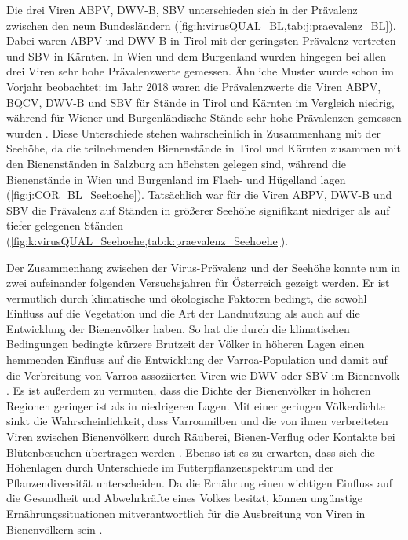 Die drei Viren ABPV, DWV-B, SBV unterschieden sich in der Prävalenz zwischen den neun Bundesländern (\cref{fig:h:virusQUAL_BL,tab:j:praevalenz_BL}). Dabei waren ABPV und DWV-B in Tirol mit der geringsten Prävalenz vertreten und SBV in Kärnten. In Wien und dem Burgenland wurden hingegen bei allen drei Viren sehr hohe Prävalenzwerte gemessen. Ähnliche Muster wurde schon im Vorjahr beobachtet: im Jahr 2018 waren die Prävalenzwerte die Viren ABPV, BQCV, DWV-B und SBV für Stände in Tirol und Kärnten im Vergleich niedrig, während für Wiener und Burgenländische Stände sehr hohe Prävalenzen gemessen wurden \citep{brodschneider2019b}. Diese Unterschiede stehen wahrscheinlich in Zusammenhang mit der Seehöhe, da die teilnehmenden Bienenstände in Tirol und Kärnten zusammen mit den Bienenständen in Salzburg am höchsten gelegen sind, während die Bienenstände in Wien und Burgenland im Flach- und Hügelland lagen (\cref{fig:j:COR_BL_Seehoehe}). Tatsächlich war für die Viren ABPV, DWV-B und SBV die Prävalenz auf Ständen in größerer Seehöhe signifikant niedriger als auf tiefer gelegenen Ständen (\cref{fig:k:virusQUAL_Seehoehe,tab:k:praevalenz_Seehoehe}).


Der Zusammenhang zwischen der Virus-Prävalenz und der Seehöhe konnte nun in zwei aufeinander folgenden Versuchsjahren für Österreich gezeigt werden. Er ist vermutlich durch klimatische und ökologische Faktoren bedingt, die sowohl Einfluss auf die Vegetation und die Art der Landnutzung als auch auf die Entwicklung der Bienenvölker haben. So hat die durch die klimatischen Bedingungen bedingte kürzere Brutzeit der Völker in höheren Lagen einen hemmenden Einfluss auf die Entwicklung der Varroa-Population und damit auf die Verbreitung von Varroa-assoziierten Viren wie DWV oder SBV im Bienenvolk \citep{mcmenamin2015,sumpter2004}. Es ist außerdem zu vermuten, dass die Dichte der Bienenvölker in höheren Regionen geringer ist als in niedrigeren Lagen. Mit einer geringen Völkerdichte sinkt die Wahrscheinlichkeit, dass Varroamilben und die von ihnen verbreiteten Viren zwischen Bienenvölkern durch Räuberei, Bienen-Verflug oder Kontakte bei Blütenbesuchen übertragen werden \citep{forfert2015,forfert2016,nolan2016,peck2016}. Ebenso ist es zu erwarten, dass sich die Höhenlagen durch Unterschiede im Futterpflanzenspektrum und der Pflanzendiversität unterscheiden. Da die Ernährung einen wichtigen Einfluss auf die Gesundheit und Abwehrkräfte eines Volkes besitzt, können ungünstige Ernährungssituationen mitverantwortlich für die Ausbreitung von Viren in Bienenvölkern sein \citep{alaux2011,degrandi-hoffman2015}.

